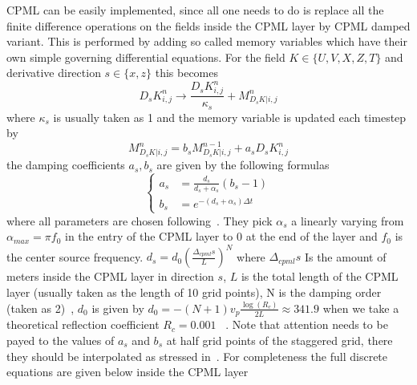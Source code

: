 \documentclass[10pt]{SelfArx} %
\theoremstyle{definition}
\begin{document}
CPML can be easily implemented, since all one needs to do is replace all the finite difference operations on the fields inside the CPML layer by CPML damped variant. This is performed by adding so called memory variables which have their own simple governing differential equations. For the field $K\in\{U,V,X,Z,T\}$ and derivative direction $s\in\{x,z\}$ this becomes
\begin{equation}
D_sK^n_{i,j} \rightarrow \frac{D_sK^n_{i,j}}{\kappa_s} + M_{D_sK|i,j}^n
\end{equation}
where $\kappa_s$ is usually taken as 1 and the memory variable is updated each timestep by
\begin{equation}
     M_{D_sK|i,j}^n = b_s M_{D_sK|i,j}^{n-1} + a_s D_sK^n_{i,j}
\end{equation} 
the damping coefficients $a_s, b_s$ are given by the following formulas
\begin{equation}
\left\{
\begin{aligned}
a_s &= \frac{d_s}{d_s + \alpha_s}\left(b_s - 1\right) \\
b_s &= e ^ {-(d_s + \alpha_s)\Delta t}
\end{aligned}\right.
\end{equation}
where all parameters are chosen following~\cite{Komatitsch2007}. They pick $\alpha_s$ a linearly varying from $\alpha_{max}=\pi f_0$ in the entry of the CPML layer to 0 at the end of the layer and $f_0$ is the center source frequency. $d_s = d_0\left(\frac{\Delta_{cpml} s}{L}\right)^N$ where $\Delta_{cpml} s$ Is the amount of meters inside the CPML layer in direction $s$, $L$ is the total length of the CPML layer (usually taken as the length of 10 grid points), N is the damping order (taken as 2)~\cite{Collino2001}, $d_0$ is given by $d_0=-\left(N +1\right)v_p \frac{\log\left(R_c\right)}{2L} \approx 341.9$ when we take a theoretical reflection coefficient $R_c=0.001$ ~\cite{Collino2001}. Note that attention needs to be payed to the values of $a_s$ and $b_s$ at half grid points of the staggered grid, there they should be interpolated as stressed in~\cite{Komatitsch2007}. 
For completeness the full discrete equations are given below inside the CPML layer
\end{document}
